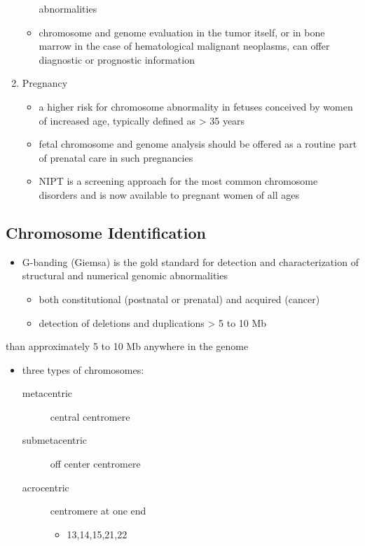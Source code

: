 \documentclass{scrartcl}
\begin{document}
\begin{enumerate}
\begin{itemize}
abnormalities
\item chromosome and genome evaluation in the tumor itself, or in bone
marrow in the case of hematological malignant neoplasms, can offer
diagnostic or prognostic information
\end{itemize}
\item Pregnancy
\label{sec:org6f6163b}
\begin{itemize}
\item a higher risk for chromosome abnormality in fetuses conceived by
women of increased age, typically defined as \textgreater{} 35 years
\item fetal chromosome and genome analysis should be offered as a routine
part of prenatal care in such pregnancies
\item NIPT is a screening approach for the most common chromosome
disorders and is now available to pregnant women of all ages
\end{itemize}
\end{enumerate}

\subsection{Chromosome Identification}
\label{sec:orga59acdf}
\begin{itemize}
\item G-banding (Giemsa) is the gold standard for detection and
characterization of structural and numerical genomic abnormalities
\begin{itemize}
\item both constitutional (postnatal or prenatal) and acquired (cancer)
\item detection of deletions and duplications \textgreater{} 5 to 10 Mb
\end{itemize}
\end{itemize}
than approximately 5 to 10 Mb anywhere in the genome
\begin{itemize}
\item three types of chromosomes:
\begin{description}
\item[{metacentric}] central centromere
\item[{submetacentric}] off center centromere
\item[{acrocentric}] centromere at one end
\begin{itemize}
\item 13,14,15,21,22
\end{itemize}
\end{description}
\end{itemize}
\end{document}
